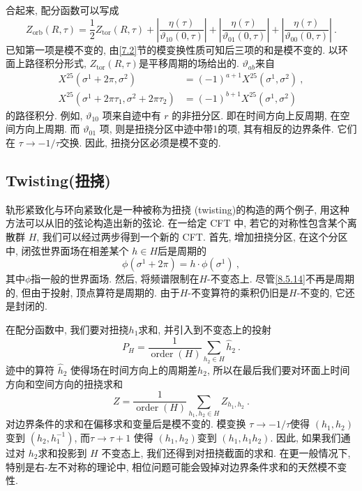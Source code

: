 合起来, 配分函数可以写成
\begin{equation}
	Z_{\text{orb}}(R, \tau)=\frac{1}{2} Z_{\text{tor}}(R, \tau) + \left|\frac{\eta(\tau)}{\vartheta_{10}(0, \tau)}\right|
	+ \left|\frac{\eta(\tau)}{\vartheta_{01}(0, \tau)}\right|+\left|\frac{\eta(\tau)}{\vartheta_{00}(0, \tau)}\right| \:. \label{8.5.12}
\end{equation}
已知第一项是模不变的, 由\eqref{7.2}节的模变换性质可知后三项的和是模不变的. 以环面上路径积分形式, $Z_{\text{tor}}(R, \tau)$是平移周期的场给出的. 
$\vartheta_{a b}$来自
\begin{subequations} \label{8.5.13}
\begin{align}
		X^{25}(\sigma^{1}+2 \pi, \sigma^{2}) &= (-1)^{a+1} X^{25}(\sigma^{1}, \sigma^{2}) \:, \label{8.5.13a}  \\
		X^{25}(\sigma^{1}+2 \pi \tau_{1}, \sigma^{2}+2 \pi \tau_{2}) &= (-1)^{b+1} X^{25}(\sigma^{1}, \sigma^{2})  \label{8.5.13b}
\end{align}
\end{subequations}
的路径积分. 例如, $\vartheta_{10}$ 项来自迹中有 $r$ 的非扭分区. 即在时间方向上反周期, 在空间方向上周期. 
而 $\vartheta_{01}$ 项, 则是扭挠分区中迹中带1的项, 其有相反的边界条件. 它们在 $\tau \rightarrow-1/\tau$交换. 
因此, 扭挠分区必须是模不变的.

\subsection*{Twisting(扭挠)}
轨形紧致化与环向紧致化是一种被称为扭挠 (twisting)的构造的两个例子, 用这种方法可以从旧的弦论构造出新的弦论. 在一给定 CFT 中, 若它的对称性包含某个离散群 $H$, 
我们可以经过两步得到一个新的 CFT. 
首先, 增加扭挠分区, 在这个分区中, 闭弦世界面场在相差某个 $h \in H$后是周期的
\begin{equation}
	\phi(\sigma^{1}+2 \pi )=h \cdot \phi(\sigma^{1}) \:, \label{8.5.14}
\end{equation}
其中$\phi$指一般的世界面场. 然后, 将频谱限制在$H$-不变态上. 尽管\eqref{8.5.14}不再是周期的, 但由于投射, 顶点算符是周期的. 
由于$H$-不变算符的乘积仍旧是$H$-不变的, 它还是封闭的. 

在配分函数中, 我们要对扭挠$h_{1}$求和, 并引入到不变态上的投射
\begin{equation}
	P_{H}=\frac{1}{\operatorname{order}(H)} \sum_{h_{2} \in H} \hat{h}_{2} \:. \label{8.5.15}
\end{equation}
迹中的算符 $\hat{h}_{2}$ 使得场在时间方向上的周期差$h_{2}$, 所以在最后我们要对环面上时间方向和空间方向的扭挠求和
\begin{equation}
	Z=\frac{1}{\operatorname{order}(H)} \sum_{h_{1}, h_{2} \in H} Z_{h_{1}, h_{2}} \:. \label{8.5.16}
\end{equation}
对边界条件的求和在偏移求和变量后是模不变的. 模变换 $\tau \rightarrow-1 / \tau$使得 $(h_{1}, h_{2})$ 变到 $(h_{2}, h_{1}^{-1})$, 
而$\tau \rightarrow \tau+1$ 使得 $(h_{1}, h_{2})$变到 $(h_{1}, h_{1} h_{2})$. 因此, 如果我们通过对 $h_{2}$求和投影到 $H$ 不变态上, 我们还得到对扭挠截面的求和. 在更一般情况下, 特别是右-左不对称的理论中, 相位问题可能会毁掉对边界条件求和的天然模不变性.

